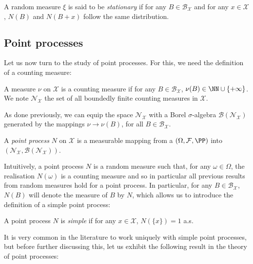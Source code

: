 \begin{definition}
    A random measure $\xi$ is said to be \emph{stationary} if 
    for any $B\in\mathcal{B}_{\mathcal{X}}$ and for any $x\in\mathcal{X}$, $N(B)$ and $N(B+x)$ follow the same distribution.
\end{definition}

\subsection{Point processes}

Let us now turn to the study of point processes. For this, we need the definition of a counting measure:

\begin{definition}
    A measure $\nu$ on $\mathcal{X}$ is a counting measure if for any $B\in\mathcal{B}_{\mathcal{X}}$, $\nu(B)\in\NN \cup \{+\infty\}$.
    We note $\mathcal{N}_{\mathcal{X}}$ the set of all boundedly finite counting measures in $\mathcal{X}$.
\end{definition}

As done previously, we can equip the space $\mathcal{N}_{\mathcal{X}}$ with a Borel $\sigma$-algebra $\mathcal{B}(\mathcal{N}_{\mathcal{X}})$ generated by the mappings $\nu \to \nu(B)$, for all $B\in\mathcal{B}_{\mathcal{X}}$.

\begin{definition}
    A \emph{point process} $N$ on $\mathcal{X}$ is a measurable mapping from a $(\Omega, \mathcal{F}, \PP)$ into $(\mathcal{N}_{\mathcal{X}}, \mathcal{B}(\mathcal{N}_{\mathcal{X}}))$.
\end{definition}

Intuitively, a point process $N$ is a random measure \parencite[Corollary 1.6.4.]{Baccelli2020} such that, for any $\omega\in\Omega$, the realisation $N(\omega)$ is a counting measure and so in particular all previous results from random measures hold for a point process.
In particular, for any $B\in\mathcal{B}_{\mathcal{X}}$, $N(B)$ will denote the measure of $B$ by $N$, which allows us to introduce the definition of a simple point process:

\begin{definition}
A point process $N$ is \emph{simple} if for any $x\in\mathcal{X}$, $N(\{x\}) = 1$ a.s.
\end{definition}

It is very common in the literature to work uniquely with simple point processes, but before further discussing this, let us exhibit the following result in the theory of point processes:

